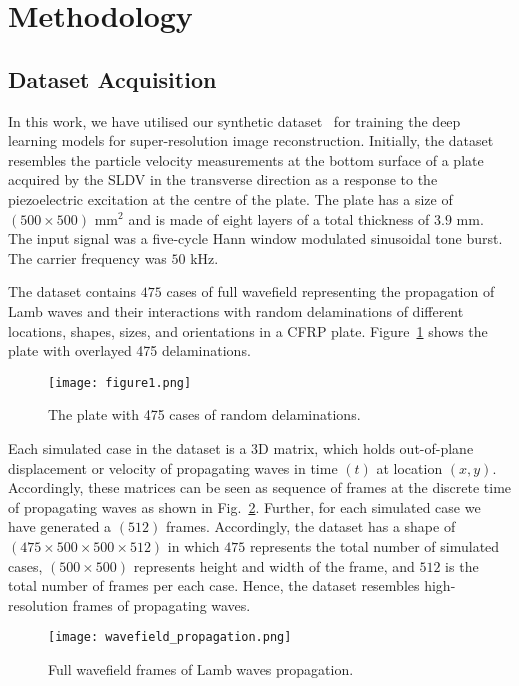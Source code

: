 \section{Methodology}
\subsection{Dataset Acquisition}
In this work, we have utilised our synthetic  dataset~\cite{kudela_pawel_2021_5414555} for training the deep learning models for super-resolution image reconstruction.  
Initially, the dataset resembles the particle velocity measurements at the bottom surface of a plate acquired by the SLDV in the transverse direction as a response to the piezoelectric excitation at the centre of the plate.
The plate has a size of \( (500\times500)\) mm\(^2\) and is made of eight layers of a total thickness of \(3.9\) mm.
The input signal was a five-cycle Hann window modulated sinusoidal tone burst. The carrier frequency was \(50\) kHz.

The dataset contains \(475\) cases of full wavefield representing the propagation of Lamb waves and their interactions with random delaminations of different locations, shapes, sizes, and orientations in a CFRP plate.
Figure~\ref{fig:All_cases} shows the plate with overlayed 475 delaminations.
\begin{figure} [h!]
	\begin{center}
		\texttt{[image: figure1.png]}
	\end{center}
	\caption{The plate with 475 cases of random delaminations.} 
	\label{fig:All_cases}
\end{figure}

Each simulated case in the dataset is a 3D matrix, which holds out-of-plane displacement or velocity of propagating waves in time \((t)\) at location \((x,y)\). 
Accordingly, these matrices can be seen as sequence of frames at the discrete time of propagating waves as shown in Fig.~\ref{fig:wavefield_propagation}. 
Further, for each simulated case we have generated a \((512)\) frames.
Accordingly, the dataset has a shape of \((475\times500\times500\times512)\) in which \(475\) represents the total number of simulated cases, \((500\times500)\) represents height and width of the frame, and \(512\) is the total number of frames per each case.
Hence, the dataset resembles high-resolution frames of propagating waves.
\begin{figure} [h!]
	\begin{center}
		\texttt{[image: wavefield\_propagation.png]}
	\end{center}
	\caption{Full wavefield frames of Lamb waves propagation.} 
	\label{fig:wavefield_propagation}
\end{figure}

